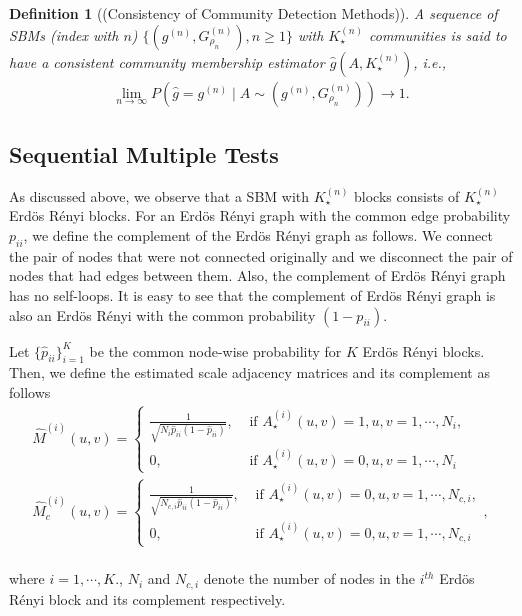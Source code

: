 \documentclass[11pt]{article}
\newtheorem{definition}[theorem]{Definition}
\newcommand{\be}{\begin{eqnarray}}
\newcommand{\ee}{\end{eqnarray}}
\newcommand{\ba}{\begin{eqnarray*}}
\newcommand{\ea}{\end{eqnarray*}}
\begin{document}
\begin{definition}[(Consistency of Community Detection Methods)]\label{cons.def}
A sequence of SBMs (index with $n$) $\{ (g^{(n)}, G^{(n)}_{\rho_n}), n \ge 1 \}$ with $K_{\star}^{(n)}$ communities is said to have a consistent community membership estimator $\hat{g}(A, K_{\star}^{(n)})$, i.e.,\\
\ba
\lim_{n \to \infty} P(\hat{g} = g^{(n)} \mid A \sim (g^{(n)}, G^{(n)}_{\rho_n})) \to 1.
\ea
\end{definition}

\subsection{Sequential Multiple Tests} As discussed above, we observe that a SBM with $K_{\star}^{(n)}$ blocks consists of $K_{\star}^{(n)}$ Erd\"{o}s R\'{e}nyi blocks. For an Erd\"{o}s R\'{e}nyi graph with the common edge probability $p_{ii}$, we define the complement of the Erd\"{o}s R\'{e}nyi graph as follows. We connect the pair of nodes that were not connected originally and we disconnect the pair of nodes that had edges between them. Also, the complement of Erd\"{o}s R\'{e}nyi graph has no self-loops. It is easy to see that the complement of Erd\"{o}s R\'{e}nyi graph is also an Erd\"{o}s R\'{e}nyi with the common probability $(1 - p_{ii})$.

Let $\{ \hat{p}_{ii}\}_{i=1}^K$ be the common node-wise probability for $K$ Erd\"{o}s R\'{e}nyi blocks. Then, we define the estimated scale adjacency matrices and its complement as follows\\

\be\label{est.M}
\hat{M}^{(i)}(u,v) = \begin{cases}
\frac{1}{\sqrt{N_i \hat{p}_{ii}(1 - \hat{p}_{ii})}} , & \text{ if } A_{\star}^{(i)}(u,v)=1, u,v=1, \cdots, N_i, \\
0 , & \text{ if } A_{\star}^{(i)}(u,v) =0, u, v =1, \cdots, N_i
\end{cases}\\
\label{est.Mc}\hat{M}^{(i)}_c(u,v) = \begin{cases}
\frac{1}{\sqrt{N_{c, i} \hat{p}_{ii}(1 - \hat{p}_{ii})}} , & \text{ if } A_{\star}^{(i)}(u,v)=0, u,v=1, \cdots, N_{c, i}, \\
0 , & \text{ if } A_{\star}^{(i)}(u,v) =0, u, v =1, \cdots, N_{c,i}
\end{cases},
\ee\\
where $i=1, \cdots, K$., $N_i$ and $N_{c,i}$ denote the number of nodes in the $i^{th}$ Erd\"{o}s R\'{e}nyi block and its complement respectively.
\end{document}

